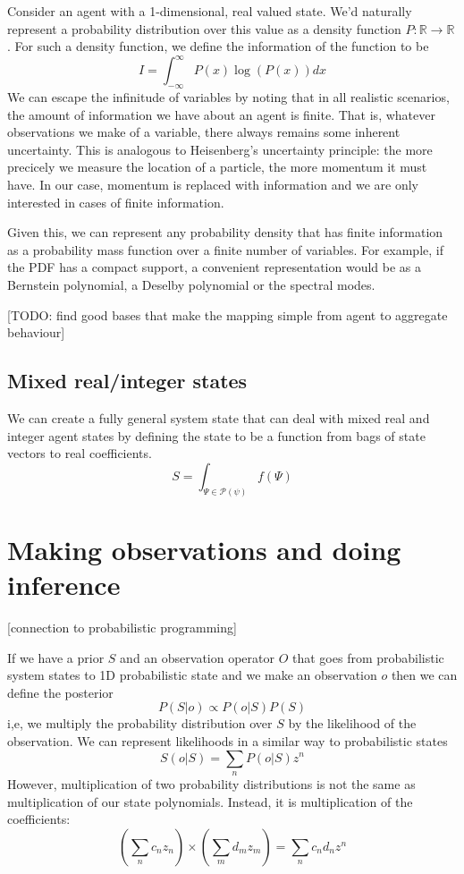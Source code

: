 \documentclass[letterpaper,twocolumn,10pt]{article}
\begin{document}
Consider an agent with a 1-dimensional, real valued state. We'd naturally represent a probability distribution over this value as a density function $P:\mathbb{R} \rightarrow \mathbb{R}$. For such a density function, we define the information of the function to be
\[
I = \int_{-\infty}^\infty P(x) \log(P(x)) dx
\]
We can escape the infinitude of variables by noting that in all realistic scenarios, the amount of information we have about an agent is finite. That is, whatever observations we make of a variable, there always remains some inherent uncertainty. This is analogous to Heisenberg's uncertainty principle: the more precicely we measure the location of a particle, the more momentum it must have. In our case, momentum is replaced with information and we are only interested in cases of finite information.

Given this, we can represent any probability density that has finite information as a probability mass function over a finite number of variables. For example, if the PDF has a compact support, a convenient representation would be as a Bernstein polynomial, a Deselby polynomial or the spectral modes.

[TODO: find good bases that make the mapping simple from agent to aggregate behaviour]

\subsection{Mixed real/integer states}
 We can create a fully general system state that can deal with mixed real and integer agent states by defining the state to be a function from bags of state vectors to real coefficients.
 \[
 S = \int_{\Psi\in\mathcal{P}(\psi)} f(\Psi)
 \]

\section{Making observations and doing inference}

[connection to probabilistic programming]

If we have a prior $S$ and an observation operator $O$ that goes from probabilistic system states to 1D probabilistic state and we make an observation $o$ then we can define the posterior
\[
P(S|o) \propto P(o|S)P(S)
\]
i,e, we multiply the probability distribution over $S$ by the likelihood of the observation. We can represent likelihoods in a similar way to probabilistic states
\[
S(o|S) = \sum_n P(o|S)z^n
\]
However, multiplication of two probability distributions is not the same as multiplication of our state polynomials. Instead, it is multiplication of the coefficients:
\[
\left(\sum_n c_n z_n\right) \times \left(\sum_m d_mz_m\right) = \sum_n c_nd_nz^n
\]
\end{document}
